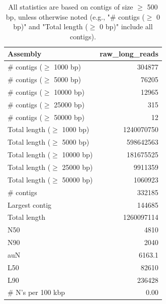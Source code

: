 \documentclass[12pt,a4paper]{article}
\begin{document}
\begin{table}[ht]
\begin{center}
\caption{All statistics are based on contigs of size $\geq$ 500 bp, unless otherwise noted (e.g., "\# contigs ($\geq$ 0 bp)" and "Total length ($\geq$ 0 bp)" include all contigs).}
\begin{tabular}{|l*{1}{|r}|}
\hline
Assembly & raw\_long\_reads \\ \hline
\# contigs ($\geq$ 1000 bp) & 304877 \\ \hline
\# contigs ($\geq$ 5000 bp) & 76205 \\ \hline
\# contigs ($\geq$ 10000 bp) & 12965 \\ \hline
\# contigs ($\geq$ 25000 bp) & 315 \\ \hline
\# contigs ($\geq$ 50000 bp) & 12 \\ \hline
Total length ($\geq$ 1000 bp) & 1240070750 \\ \hline
Total length ($\geq$ 5000 bp) & 598642563 \\ \hline
Total length ($\geq$ 10000 bp) & 181675525 \\ \hline
Total length ($\geq$ 25000 bp) & 9911359 \\ \hline
Total length ($\geq$ 50000 bp) & 1060923 \\ \hline
\# contigs & 332185 \\ \hline
Largest contig & 144685 \\ \hline
Total length & 1260097114 \\ \hline
N50 & 4810 \\ \hline
N90 & 2040 \\ \hline
auN & 6163.1 \\ \hline
L50 & 82610 \\ \hline
L90 & 236428 \\ \hline
\# N's per 100 kbp & 0.00 \\ \hline
\end{tabular}
\end{center}
\end{table}
\end{document}
